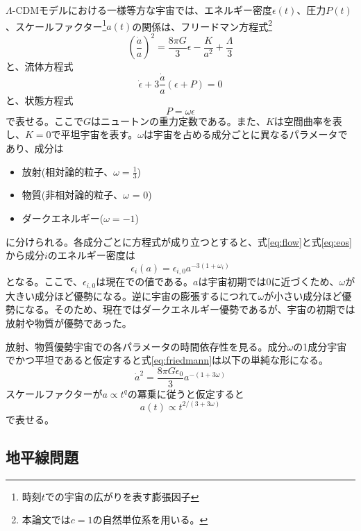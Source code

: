 $\Lambda$-CDMモデルにおける一様等方な宇宙では、エネルギー密度$\epsilon(t)$、圧力$P(t)$、スケールファクター\footnote{時刻$t$での宇宙の広がりを表す膨張因子}$a(t)$の関係は、フリードマン方程式\footnote{本論文では$c=1$の自然単位系を用いる。}
\begin{equation}
  \left(\frac{\dot{a}}{a}\right)^2 = \frac{8\pi G}{3}\epsilon -\frac{K}{a^2} + \frac{\Lambda}{3} \label{eq:friedmann}
\end{equation}
と、流体方程式
\begin{equation}
  \dot{\epsilon} + 3\frac{\dot{a}}{a}(\epsilon + P) = 0 \label{eq:flow}
\end{equation}
と、状態方程式
\begin{equation}
  P = \omega\epsilon \label{eq:eos}
\end{equation}
で表せる。ここで$G$はニュートンの重力定数である。また、$K$は空間曲率を表し、$K=0$で平坦宇宙を表す。$\omega$は宇宙を占める成分ごとに異なるパラメータであり、成分は
\begin{itemize}
  \item 放射(相対論的粒子、$\omega=\frac{1}{3}$)
  \item 物質(非相対論的粒子、$\omega$ = 0)
  \item ダークエネルギー($\omega = -1$)
\end{itemize}
に分けられる。各成分ごとに方程式が成り立つとすると、式\eqref{eq:flow}と式\eqref{eq:eos}から成分$i$のエネルギー密度は
\begin{equation}
  \epsilon_{i}(a) = \epsilon_{i,0}a^{-3(1+\omega_{i})}
\end{equation}
となる。ここで、$\epsilon_{i,0}$は現在での値である。$a$は宇宙初期では0に近づくため、$\omega$が大きい成分ほど優勢になる。逆に宇宙の膨張するにつれて$\omega$が小さい成分ほど優勢になる。そのため、現在ではダークエネルギー優勢であるが、宇宙の初期では放射や物質が優勢であった。

放射、物質優勢宇宙での各パラメータの時間依存性を見る。成分$\omega$の1成分宇宙でかつ平坦であると仮定すると式\eqref{eq:friedmann}は以下の単純な形になる。
\begin{equation}
  \dot{a}^{2} = \frac{8\pi G\epsilon_{0}}{3}a^{-(1+3\omega)}
\end{equation}
スケールファクターが$a\propto t^{q}$の冪乗に従うと仮定すると
\begin{equation}
  a(t) \propto t^{2/(3+3\omega)}
\end{equation}
で表せる。

\subsection{地平線問題}


